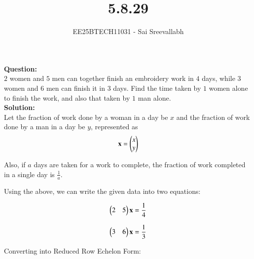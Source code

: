 \documentclass[journal]{IEEEtran}
\begin{document}

\vspace{3cm}

\title{5.8.29}
\author {EE25BTECH11031 - Sai Sreevallabh}
{\let\newpage\relax\maketitle}

\renewcommand{\thefigure}{\theenumi}
\renewcommand{\thetable}{\theenumi}
\setlength{\intextsep}{10pt} %


\renewcommand{\thetable}{\theenumi}

\textbf{Question: }\\

 $2$ women and $5$ men can together finish an embroidery work in $4$ days, while $3$ women and $6$ men can finish it in $3$ days. Find the time taken by $1$ women alone to finish the work, and also that taken by $1$ man alone.\\

\textbf{Solution: }\\ 

Let the fraction of work done by a woman in a day be $x$ and the fraction of work done by a man in a day be $y$, represented as 
\begin{align}
    \mathbf{x} = \begin{pmatrix}x\\y\end{pmatrix}
\end{align}

Also, if $a$ days are taken for a work to complete, the fraction of work completed in a single day is $\frac{1}{a}$.


Using the above, we can write the given data into two equations:

\begin{align}
    \begin{pmatrix}2&5\end{pmatrix}\mathbf{x} = \frac{1}{4} \label{eq2}
\end{align}

\begin{align}
    \begin{pmatrix}3&6\end{pmatrix}\mathbf{x} = \frac{1}{3} \label{eq3}
\end{align}

Converting into Reduced Row Echelon Form:
\end{document}
